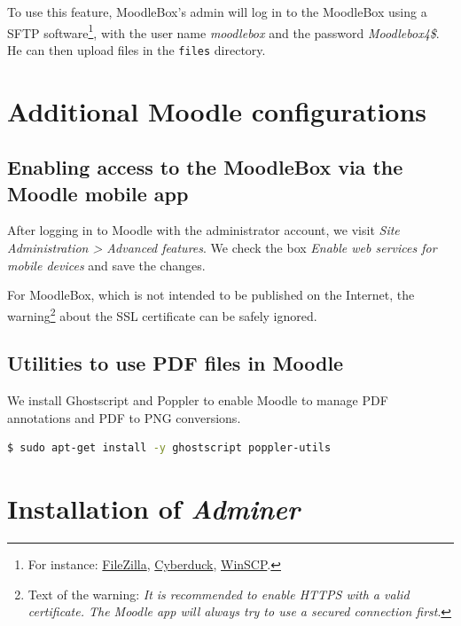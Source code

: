 \documentclass[12pt]{article}
\begin{document}
To use this feature, MoodleBox's admin will log in to the MoodleBox using a SFTP software\footnote{For instance: \href{https://filezilla-project.org/}{FileZilla}, \href{https://cyberduck.io/}{Cyberduck}, \href{http://winscp.net/}{WinSCP}.}, with the user name \emph{moodlebox} and the password \emph{Moodlebox4\$}.
He can then upload files in the \lstinline{files} directory.

\section{Additional Moodle configurations}

\subsection{Enabling access to the MoodleBox via the Moodle mobile app}

After logging in to Moodle with the administrator account, we visit \textsl{Site Administration > Advanced features}.
We check the box \emph{Enable web services for mobile devices} and save the changes.

For MoodleBox, which is not intended to be published on the Internet, the warning\footnote{Text of the warning: \textsl{It is recommended to enable HTTPS with a valid certificate. The Moodle app will always try to use a secured connection first}.} about the SSL certificate can be safely ignored.

\subsection{Utilities to use PDF files in Moodle}

We install Ghostscript and Poppler to enable Moodle to manage PDF annotations and PDF to PNG conversions.
\begin{lstlisting}[language=bash]
$ sudo apt-get install -y ghostscript poppler-utils
\end{lstlisting}

\section{Installation of \textsl{Adminer}}
\end{document}
